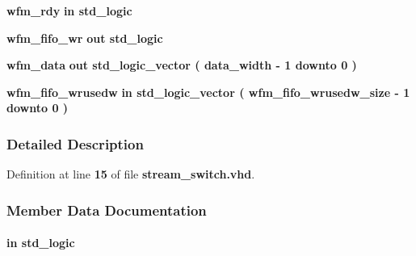 \begin{DoxyCompactItemize}
\item 
{\bf wfm\+\_\+rdy}  {\bfseries {\bfseries \textcolor{keywordflow}{in}\textcolor{vhdlchar}{ }}} {\bfseries \textcolor{comment}{std\+\_\+logic}\textcolor{vhdlchar}{ }} 
\item 
{\bf wfm\+\_\+fifo\+\_\+wr}  {\bfseries {\bfseries \textcolor{keywordflow}{out}\textcolor{vhdlchar}{ }}} {\bfseries \textcolor{comment}{std\+\_\+logic}\textcolor{vhdlchar}{ }} 
\item 
{\bf wfm\+\_\+data}  {\bfseries {\bfseries \textcolor{keywordflow}{out}\textcolor{vhdlchar}{ }}} {\bfseries \textcolor{comment}{std\+\_\+logic\+\_\+vector}\textcolor{vhdlchar}{ }\textcolor{vhdlchar}{(}\textcolor{vhdlchar}{ }\textcolor{vhdlchar}{ }\textcolor{vhdlchar}{ }\textcolor{vhdlchar}{ }{\bfseries {\bf data\+\_\+width}} \textcolor{vhdlchar}{-\/}\textcolor{vhdlchar}{ } \textcolor{vhdldigit}{1} \textcolor{vhdlchar}{ }\textcolor{keywordflow}{downto}\textcolor{vhdlchar}{ }\textcolor{vhdlchar}{ } \textcolor{vhdldigit}{0} \textcolor{vhdlchar}{ }\textcolor{vhdlchar}{)}\textcolor{vhdlchar}{ }} 
\item 
{\bf wfm\+\_\+fifo\+\_\+wrusedw}  {\bfseries {\bfseries \textcolor{keywordflow}{in}\textcolor{vhdlchar}{ }}} {\bfseries \textcolor{comment}{std\+\_\+logic\+\_\+vector}\textcolor{vhdlchar}{ }\textcolor{vhdlchar}{(}\textcolor{vhdlchar}{ }\textcolor{vhdlchar}{ }\textcolor{vhdlchar}{ }\textcolor{vhdlchar}{ }{\bfseries {\bf wfm\+\_\+fifo\+\_\+wrusedw\+\_\+size}} \textcolor{vhdlchar}{-\/}\textcolor{vhdlchar}{ } \textcolor{vhdldigit}{1} \textcolor{vhdlchar}{ }\textcolor{keywordflow}{downto}\textcolor{vhdlchar}{ }\textcolor{vhdlchar}{ } \textcolor{vhdldigit}{0} \textcolor{vhdlchar}{ }\textcolor{vhdlchar}{)}\textcolor{vhdlchar}{ }} 
\end{DoxyCompactItemize}


\subsubsection{Detailed Description}


Definition at line {\bf 15} of file {\bf stream\+\_\+switch.\+vhd}.



\subsubsection{Member Data Documentation}
\paragraph[{clk}]{ {\bfseries \textcolor{keywordflow}{in}\textcolor{vhdlchar}{ }} {\bfseries \textcolor{comment}{std\+\_\+logic}\textcolor{vhdlchar}{ }} \hspace{0.3cm}{\ttfamily [Port]}}\label{classstream__switch_a4a4609c199d30b3adebbeb3a01276ec5}


